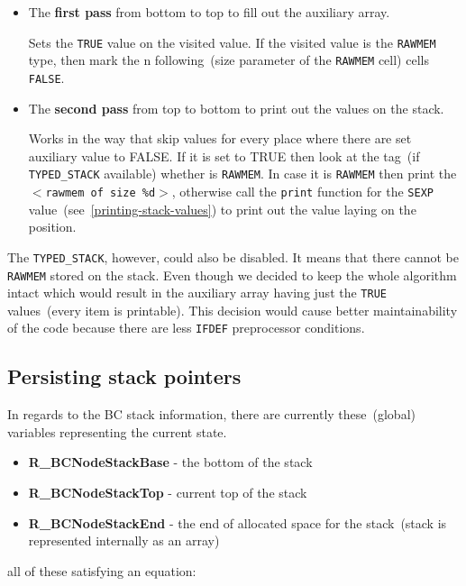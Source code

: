\documentclass[thesis=M,english]{FITthesis}[2018/10/20]
\newcommand{\code}[1]{\texttt{#1}}
\begin{document}
\begin{itemize}
	\item The \textbf{first pass} from bottom to top to fill out the auxiliary array.

			Sets the \code{TRUE} value on the visited value. If the visited value is the \code{RAWMEM} type, then mark the n following~(size parameter of the \code{RAWMEM} cell) cells \code{FALSE}.

	\item The \textbf{second pass} from top to bottom to print out the values on the stack.

			Works in the way that skip values for every place where there are set auxiliary value to FALSE. If it is set to TRUE then look at the tag~(if \code{TYPED{\_}STACK} available) whether is \code{RAWMEM}. In case it is \code{RAWMEM} then print the \code{$<$rawmem of size \%d$>$}, otherwise call the \code{print} function for the \code{SEXP} value~(see~\ref{printing-stack-values}) to print out the value laying on the position.
\end{itemize}

The \code{TYPED{\_}STACK}, however, could also be disabled. It means that there cannot be \code{RAWMEM} stored on the stack. Even though we decided to keep the whole algorithm intact which would result in the auxiliary array having just the \code{TRUE} values~(every item is printable). This decision would cause better maintainability of the code because there are less \code{IFDEF} preprocessor conditions.

\subsection{Persisting stack pointers}\label{persisting-stack-pointers}

In regards to the BC stack information, there are currently these~(global) variables representing the current state.

\begin{itemize}
	\item \textbf{R{\_}BCNodeStackBase} - the bottom of the stack
	\item \textbf{R{\_}BCNodeStackTop} - current top of the stack
	\item \textbf{R{\_}BCNodeStackEnd} - the end of allocated space for the stack~(stack is represented internally as an array)
\end{itemize}

all of these satisfying an equation:
\end{document}
